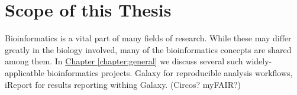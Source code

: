 \section{Scope of this Thesis}
Bioinformatics is a vital part of many fields of research. While these may differ greatly in the biology involved, many of the bioinformatics concepts are shared among them. In \hyperref[chapter:general]{Chapter \ref{chapter:general}} we discuss several such widely-applicatble bioinformatics projects. Galaxy for reproducible analysis workflows, iReport for results reporting withing Galaxy. (Circos? myFAIR?)





